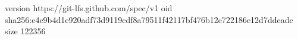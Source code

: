 version https://git-lfs.github.com/spec/v1
oid sha256:e4c9b4d1e920adf73d9119cdf8a79511f42117bf476b12e722186e12d7ddeadc
size 122356
